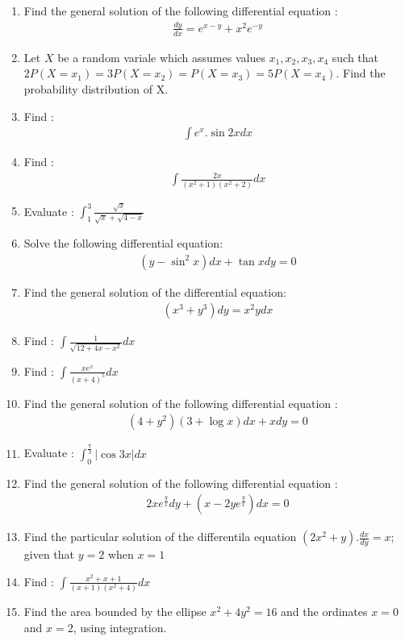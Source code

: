 \documentclass{article}
\begin{document}
\begin{enumerate}
	\item Find the general solution of the following differential equation : 
		\begin{align}
			\frac{dy}{dx}=e^{x-y}+x^2 e^{-y}
		\end{align}
	\item Let $X$ be a random variale which assumes values $x_1,x_2,x_3,x_4$ such that $2P(X=x_1)=3P(X=x_2)=P(X=x_3)=5P(X=x_4)$. Find the probability distribution of X.
	\item Find : 
		\begin{align}
			\int e^x . \sin 2x dx
		\end{align}
	\item Find :
		\begin{align}
			\int \frac{2x}{(x^2 +1)(x^2 +2)} dx
		\end{align}
	\item Evaluate : $\int_1^3 \frac{\sqrt{x}}{\sqrt{x} + \sqrt{4-x}}$
	\item Solve the following differential equation:
		\begin{align}
			(y-\sin^2 x)dx+\tan x dy=0
		\end{align}
	\item Find the general solution of the differential equation:
		\begin{align}
			(x^3+y^3)dy=x^2y dx
		\end{align}
	\item Find : $\int \frac{1}{\sqrt{12+4x-x^2}}dx$
	\item Find : $\int \frac{xe^x}{(x+4)^5}dx$
	\item Find the general solution of the following differential equation : 
		\begin{align}
			(4+y^2)(3+\log x)dx+x dy=0
		\end{align}
	\item Evaluate : $\int_0^\frac{\pi}{3} |\cos 3x| dx$
	\item Find the general solution of the following differential equation : 
		\begin{align}
			2xe^{\frac{y}{x}}dy + (x-2y e^{\frac{y}{x}})dx=0
		\end{align}
	\item Find the particular solution of the differentila equation $(2x^2+y).\frac{dx}{dy}=x$; given that $y=2$ when $x=1$
	\item Find : $\int \frac{x^2+x+1}{(x+1)(x^2+4)}dx$
	\item Find the area bounded by the ellipse $x^2+4y^2=16$ and the ordinates $x=0$ and $x=2$, using integration.

\end{enumerate}
\end{document}
